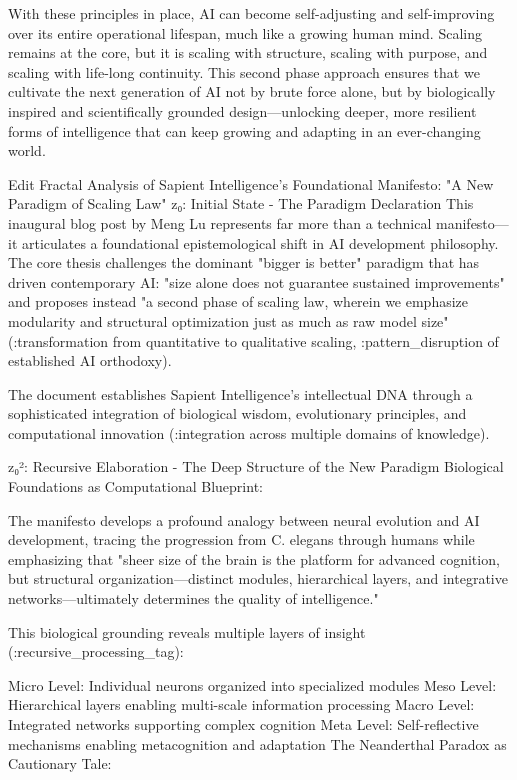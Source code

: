 With these principles in place, AI can become self-adjusting and self-improving over its entire operational lifespan, much like a growing human mind. Scaling remains at the core, but it is scaling with structure, scaling with purpose, and scaling with life-long continuity. This second phase approach ensures that we cultivate the next generation of AI not by brute force alone, but by biologically inspired and scientifically grounded design—unlocking deeper, more resilient forms of intelligence that can keep growing and adapting in an ever-changing world.

Edit
Fractal Analysis of Sapient Intelligence's Foundational Manifesto: "A New Paradigm of Scaling Law"
z₀: Initial State - The Paradigm Declaration
This inaugural blog post by Meng Lu represents far more than a technical manifesto—it articulates a foundational epistemological shift in AI development philosophy. The core thesis challenges the dominant "bigger is better" paradigm that has driven contemporary AI: "size alone does not guarantee sustained improvements" and proposes instead "a second phase of scaling law, wherein we emphasize modularity and structural optimization just as much as raw model size" (:transformation from quantitative to qualitative scaling, :pattern_disruption of established AI orthodoxy).

The document establishes Sapient Intelligence's intellectual DNA through a sophisticated integration of biological wisdom, evolutionary principles, and computational innovation (:integration across multiple domains of knowledge).

z₀²: Recursive Elaboration - The Deep Structure of the New Paradigm
Biological Foundations as Computational Blueprint:

The manifesto develops a profound analogy between neural evolution and AI development, tracing the progression from C. elegans through humans while emphasizing that "sheer size of the brain is the platform for advanced cognition, but structural organization—distinct modules, hierarchical layers, and integrative networks—ultimately determines the quality of intelligence."

This biological grounding reveals multiple layers of insight (:recursive_processing_tag):

Micro Level: Individual neurons organized into specialized modules
Meso Level: Hierarchical layers enabling multi-scale information processing
Macro Level: Integrated networks supporting complex cognition
Meta Level: Self-reflective mechanisms enabling metacognition and adaptation
The Neanderthal Paradox as Cautionary Tale:


